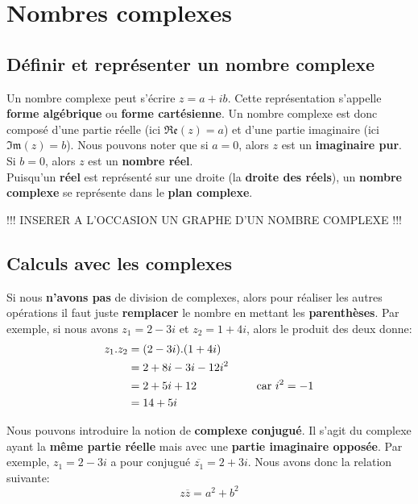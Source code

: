 \documentclass[12pt,a4paper,openany]{book}
\begin{document}
\chapter{Nombres complexes}

\section{Définir et représenter un nombre complexe}

Un nombre complexe peut s'écrire $ z = a + ib $. Cette représentation s'appelle \textbf{forme algébrique} ou \textbf{forme cartésienne}. Un nombre complexe est donc composé d'une partie réelle (ici $ \mathfrak{Re}(z) = a $) et d'une partie imaginaire (ici $ \mathfrak{Im}(z) = b $). Nous pouvons noter que si $ a = 0 $, alors $ z $ est un \textbf{imaginaire pur}. Si $ b = 0 $, alors $ z $ est un \textbf{nombre réel}.\\

Puisqu'un \textbf{réel} est représenté sur une droite (la \textbf{droite des réels}), un \textbf{nombre complexe} se représente dans le \textbf{plan complexe}.

!!!	INSERER A L'OCCASION UN GRAPHE D'UN NOMBRE COMPLEXE !!!

\section{Calculs avec les complexes}

Si nous \textbf{n'avons pas} de division de complexes, alors pour réaliser les autres opérations il faut juste \textbf{remplacer} le nombre en mettant les \textbf{parenthèses}. Par exemple, si nous avons $ z_{1} = 2 - 3i $ et $ z_{2} = 1 + 4i $, alors le produit des deux donne:
\begin{align*}
z_{1}.z_{2} & = (2 - 3i).(1 + 4i)\\
		   & = 2 + 8i - 3i -12i^{2}\\
		   & = 2 + 5i + 12 \text{\hspace{50px} car $ i^{2} = -1 $}\\
		   & = 14 + 5i
\end{align*}

Nous pouvons introduire la notion de \textbf{complexe conjugué}. Il s'agit du complexe ayant la \textbf{même partie réelle} mais avec une \textbf{partie imaginaire opposée}. Par exemple, $ z_{1} = 2 - 3i $ a pour conjugué $ \overline{z_{1}} = 2 + 3i $. Nous avons donc la relation suivante:
\begin{equation}
z\overline{z} = a^{2} + b^{2}
\end{equation}
\end{document}
